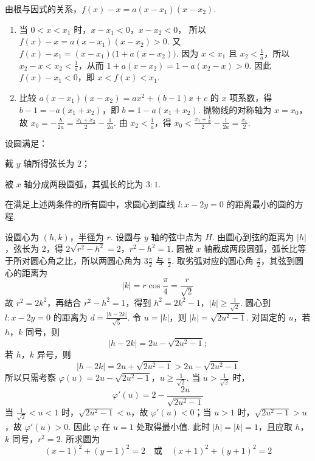 \documentclass[UTF8,a4paper,oneside,11pt]{ctexbook}
\begin{document}
\begin{solution}
由根与因式的关系，\(f(x)-x=a(x-x_{1})(x-x_{2})\).
\begin{enumerate}
\item 当 \(0<x<x_{1}\) 时，\(x-x_{1}<0\)，\(x-x_{2}<0\)，
所以 \(f(x)-x=a(x-x_{1})(x-x_{2})>0\). 又 \(f(x)-x_{1}=(x-x_{1})\bigl(1+a(x-x_{2})\bigr)\).
因为 \(x<x_{1}\) 且 \(x_{2}<\frac{1}{a}\)，所以 \(x_{2}-x<x_{2}<\frac{1}{a}\)，从而 \(1+a(x-x_{2})=1-a(x_{2}-x)>0\). 因此 \(f(x)-x_{1}<0\)，即 \(x<f(x)<x_{1}\).
\item 比较
\(a(x-x_{1})(x-x_{2})=ax^{2}+(b-1)x+c\)
的 \(x\) 项系数，得 \(b-1=-a(x_{1}+x_{2})\)，即 \(b=1-a(x_{1}+x_{2})\). 抛物线的对称轴为 \(x=x_{0}\)，故
\(x_{0}=-\frac{b}{2a}=\frac{x_{1}+x_{2}}{2}-\frac{1}{2a}\).
由 \(x_{2}<\frac{1}{a}\)，得
\(x_{0}<\frac{x_{1}+\frac{1}{a}}{2}-\frac{1}{2a}=\frac{x_{1}}{2}\).
\end{enumerate}
\end{solution}

\begin{problem}
设圆满足：

\begin{circlelist}
\item 截 \(y\) 轴所得弦长为 \(2\)；
\item 被 \(x\) 轴分成两段圆弧，其弧长的比为 \(3:1\).
\end{circlelist}

在满足上述两条件的所有圆中，求圆心到直线 \(l\colon x - 2y = 0\) 的距离最小的圆的方程.
\end{problem}

\begin{solution}
设圆心为 \((h,k)\)，半径为 \(r\). 设圆与 \(y\) 轴的弦中点为 \(H\). 由圆心到弦的距离为 \(|h|\)，弦长为 \(2\)，得
\(2\sqrt{r^{2}-h^{2}}=2\)，\(r^{2}-h^{2}=1\).
圆被 \(x\) 轴截成两段圆弧，弧长比等于所对圆心角之比，所以两圆心角为 \(3\frac{\pi}{2}\) 与 \(\frac{\pi}{2}\). 取劣弧对应的圆心角 \(\frac{\pi}{2}\)，其弦到圆心的距离为
\[
|k|=r\cos\frac{\pi}{4}=\frac{r}{\sqrt2}
\]
故 \(r^{2}=2k^{2}\)，再结合 \(r^{2}-h^{2}=1\)，得到
\(h^{2}=2k^{2}-1\)，\(|k|\geqslant\frac1{\sqrt2}\).
圆心到 \(l:x-2y=0\) 的距离为 \(d=\frac{|h-2k|}{\sqrt5}\). 令 \(u=|k|\)，则 \(|h|=\sqrt{2u^{2}-1}\). 对固定的 \(u\)，若 \(h\)，\(k\) 同号，则
\[
|h-2k|=2u-\sqrt{2u^{2}-1};
\]
若 \(h\)，\(k\) 异号，则
\[
|h-2k|=2u+\sqrt{2u^{2}-1}>2u-\sqrt{2u^{2}-1}
\]
所以只需考察
\(\varphi(u)=2u-\sqrt{2u^{2}-1}\)，\(u\geqslant\frac1{\sqrt2}\).
当 \(u>\frac1{\sqrt2}\) 时，
\[
\varphi'(u)=2-\frac{2u}{\sqrt{2u^{2}-1}}
\]
当 \(\frac1{\sqrt2}<u<1\) 时，\(\sqrt{2u^{2}-1}<u\)，故 \(\varphi'(u)<0\)；当 \(u>1\) 时，\(\sqrt{2u^{2}-1}>u\)，故 \(\varphi'(u)>0\). 因此 \(\varphi\) 在 \(u=1\) 处取得最小值. 此时 \(|h|=|k|=1\)，且应取 \(h\)，\(k\) 同号，\(r^{2}=2\). 所求圆为
\[
(x-1)^{2}+(y-1)^{2}=2\quad\text{或}\quad (x+1)^{2}+(y+1)^{2}=2
\]
\end{solution}

\end{document}
